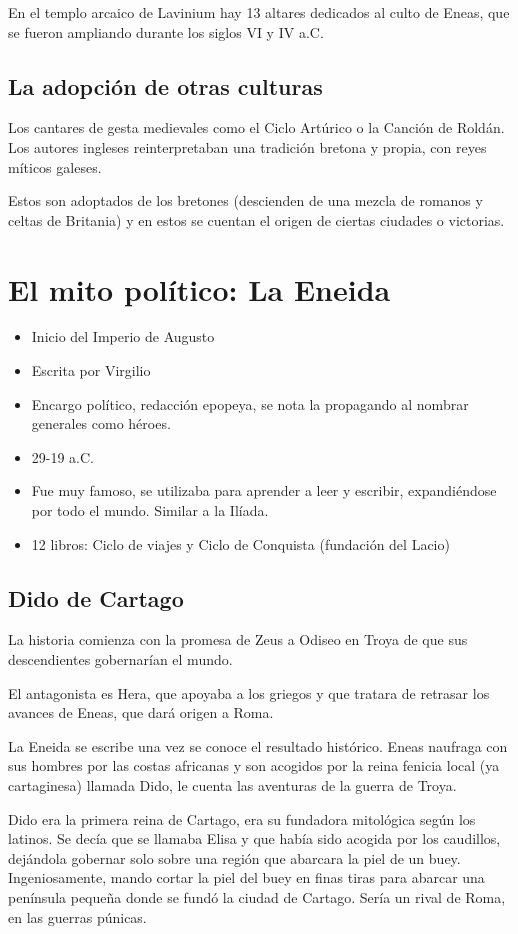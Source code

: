 En el templo arcaico de Lavinium hay 13 altares dedicados al culto de Eneas, que se fueron ampliando durante los siglos VI y IV a.C.

\subsection{La adopción de otras culturas}
Los cantares de gesta medievales como el Ciclo Artúrico o la Canción de Roldán. Los autores ingleses reinterpretaban una tradición bretona y propia, con reyes míticos galeses.

Estos son adoptados de los bretones (descienden de una mezcla de romanos y celtas de Britania) y en estos se cuentan el origen de ciertas ciudades o victorias.

\section{El mito político: La Eneida}
\begin{itemize}
	\item Inicio del Imperio de Augusto
	\item Escrita por Virgilio
	\item Encargo político, redacción epopeya, se nota la propagando al nombrar generales como héroes.
	\item 29-19 a.C.
	\item Fue muy famoso, se utilizaba para aprender a leer y escribir, expandiéndose por todo el mundo. Similar a la Ilíada.
	\item 12 libros: Ciclo de viajes y Ciclo de Conquista (fundación del Lacio)
\end{itemize}

\subsection{Dido de Cartago}
La historia comienza con la promesa de Zeus a Odiseo en Troya de que sus descendientes gobernarían el mundo.

El antagonista es Hera, que apoyaba a los griegos y que tratara de retrasar los avances de Eneas, que dará origen a Roma.

La Eneida se escribe una vez se conoce el resultado histórico. Eneas naufraga con sus hombres por las costas africanas y son acogidos por la reina fenicia local (ya cartaginesa) llamada Dido, le cuenta las aventuras de la guerra de Troya.

Dido era la primera reina de Cartago, era su fundadora mitológica según los latinos. Se decía que se llamaba Elisa y que había sido acogida por los caudillos, dejándola gobernar solo sobre una región que abarcara la piel de un buey. Ingeniosamente, mando cortar la piel del buey en finas tiras para abarcar una península pequeña donde se fundó la ciudad de Cartago. Sería un rival de Roma, en las guerras púnicas.

